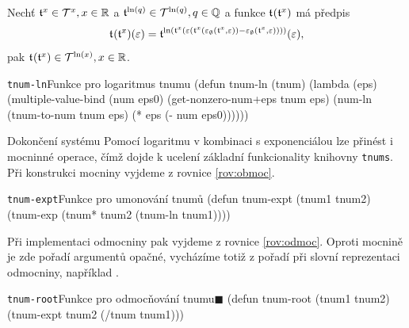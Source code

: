 \begin{fact}
Nechť $\mathfrak{t}^{x}\in\mathcal{T}^{x},x\in\mathbb{R}$ a $\mathfrak{t}^{\mathrm{ln}(q)}\in\mathcal{T}^{\mathrm{ln}(q)},q\in\mathbb{Q}$ a funkce $\mathfrak{t}^{}(\mathfrak{t}^{x})$ má předpis
\begin{equation}
\mathfrak{t}^{}(\mathfrak{t}^{x})(\varepsilon)=\mathfrak{t}^{\mathrm{ln}(\mathfrak{t}^{x}(\varepsilon(\mathfrak{t}^{x}(\varepsilon_\emptyset(\mathfrak{t}^{x},\varepsilon))-\varepsilon_\emptyset(\mathfrak{t}^{x},\varepsilon))))}(\varepsilon),
\end{equation}
pak $\mathfrak{t}^{}(\mathfrak{t}^{x})\in\mathcal{T}^{\mathrm{ln}(x)},x\in\mathbb{R}$.
\end{fact}

\begin{lispcode}{\texttt{tnum-ln}}{Funkce pro logaritmus tnumu}
(\textcolor{funkcionalni}{defun} \textcolor{pojmenovan}{tnum-ln} (tnum)
  (\textcolor{funkcionalni}{lambda} (eps)
    (\textcolor{matematicke}{multiple-value-bind} (num eps0)
        (\textcolor{moje}{get-nonzero-num+eps} tnum eps)
      (\textcolor{moje}{num-ln} (\textcolor{moje}{tnum-to-num} tnum eps) (\textcolor{matematicke}{*} eps (\textcolor{matematicke}{-} num eps0))))))
\end{lispcode}

\begin{myremarkbez}{Dokončení systému}
Pomocí logaritmu v kombinaci s exponenciálou lze přinést i mocninné operace, čímž dojde k ucelení základní funkcionality knihovny \texttt{tnums}. Při konstrukci mocniny vyjdeme z rovnice \eqref{rov:obmoc}.

\begin{lispcode}{\texttt{tnum-expt}}{Funkce pro umonování tnumů}
(\textcolor{funkcionalni}{defun} \textcolor{pojmenovan}{tnum-expt} (tnum1 tnum2)
  (\textcolor{moje}{tnum-exp} (\textcolor{moje}{tnum*} tnum2 (\textcolor{moje}{tnum-ln} tnum1))))
\end{lispcode}

Při implementaci odmocniny pak vyjdeme z rovnice \eqref{rov:odmoc}. Oproti mocnině je zde pořadí argumentů opačné, vycházíme totiž z pořadí při slovní reprezentaci odmocniny, například .

\begin{lispcode}{\texttt{tnum-root}}{Funkce pro odmocňování tnumu\hfill$\blacksquare$}
(\textcolor{funkcionalni}{defun} \textcolor{pojmenovan}{tnum-root} (tnum1 tnum2)
  (\textcolor{moje}{tnum-expt} tnum2 (\textcolor{moje}{/tnum} tnum1)))
\end{lispcode}
\end{myremarkbez}